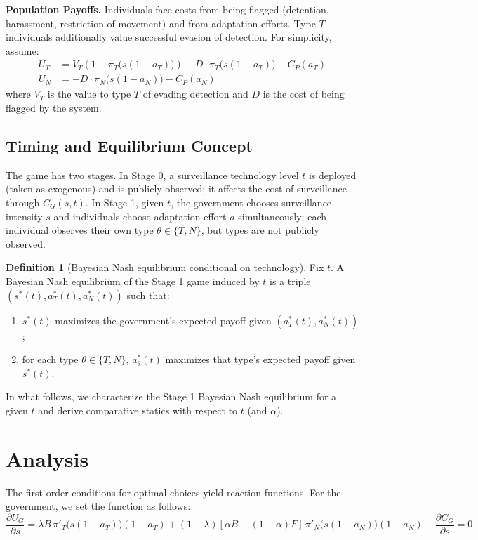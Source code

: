 \documentclass[11pt,a4paper]{article}
\theoremstyle{definition}
\newtheorem{definition}{Definition}
\theoremstyle{remark}
\theoremstyle{definition}
\begin{document}
\textbf{Population Payoffs.} Individuals face costs from being flagged (detention, harassment, restriction of movement) and from adaptation efforts. 
Type $T$ individuals additionally value successful evasion of detection. For simplicity, assume:
\begin{align}
U_T &= V_T\!\left(1 - \pi_T\!\big(s(1-a_T)\big)\right) - D \cdot \pi_T\!\big(s(1-a_T)\big) - C_P(a_T) \\
U_N &= - D \cdot \pi_N\!\big(s(1-a_N)\big) - C_P(a_N)
\end{align}
where $V_T$ is the value to type $T$ of evading detection and $D$ is the cost of being flagged by the system.

\subsection{Timing and Equilibrium Concept}

The game has two stages. In Stage 0, a surveillance technology level $t$ is deployed (taken as exogenous) and is publicly observed; it affects the cost of 
surveillance through $C_G(s,t)$. In Stage 1, given $t$, the government chooses surveillance intensity $s$ and individuals choose adaptation effort $a$ 
simultaneously; each individual observes their own type $\theta\in\{T,N\}$, but types are not publicly observed.

\begin{definition}[Bayesian Nash equilibrium conditional on technology]
Fix $t$. A Bayesian Nash equilibrium of the Stage 1 game induced by $t$ is a triple $(s^*(t),a_T^*(t),a_N^*(t))$ such that:
\begin{enumerate}[label=(\roman*), nosep]
    \item $s^*(t)$ maximizes the government's expected payoff given $(a_T^*(t),a_N^*(t))$;
    \item for each type $\theta\in\{T,N\}$, $a_\theta^*(t)$ maximizes that type's expected payoff given $s^*(t)$.
\end{enumerate}
\end{definition}

In what follows, we characterize the Stage 1 Bayesian Nash equilibrium for a given $t$ and derive comparative statics with respect to $t$ (and $\alpha$).

\section{Analysis}

The first-order conditions for optimal choices yield reaction functions. For the government, we set the function as follows:
\begin{equation}
    \frac{\partial U_G}{\partial s} 
    = \lambda B \,\pi'_T\!\big(s(1-a_T)\big)(1-a_T)
    + (1-\lambda)[\alpha B-(1-\alpha)F]\,\pi'_N\!\big(s(1-a_N)\big)(1-a_N)
    - \frac{\partial C_G}{\partial s} = 0    
\end{equation}
\end{document}
